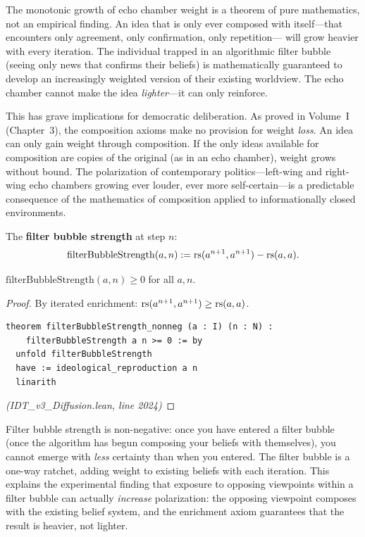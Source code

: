 \begin{interpretation}
The monotonic growth of echo chamber weight is a theorem of pure mathematics,
not an empirical finding. An idea that is only ever composed with
itself---that encounters only agreement, only confirmation, only repetition---
will grow heavier with every iteration. The individual trapped in an
algorithmic filter bubble (seeing only news that confirms their beliefs)
is mathematically guaranteed to develop an increasingly weighted version
of their existing worldview. The echo chamber cannot make the idea
\emph{lighter}---it can only reinforce.

This has grave implications for democratic deliberation. As proved in
Volume~I (Chapter~3), the composition axioms make no provision for
weight \emph{loss}. An idea can only gain weight through composition.
If the only ideas available for composition are copies of the original
(as in an echo chamber), weight grows without bound. The polarization
of contemporary politics---left-wing and right-wing echo chambers growing
ever louder, ever more self-certain---is a predictable consequence of
the mathematics of composition applied to informationally closed environments.
\end{interpretation}

\begin{definition}
\label{def:filter-bubble}
The \textbf{filter bubble strength} at step $n$:
\[
  \mathrm{filterBubbleStrength}(a, n) := \mathrm{rs}(a^{n+1}, a^{n+1}) - \mathrm{rs}(a, a).
\]
\end{definition}

\begin{theorem}
\label{thm:filter-nonneg}
$\mathrm{filterBubbleStrength}(a, n) \geq 0$ for all $a, n$.
\end{theorem}

\begin{proof}
By iterated enrichment: $\mathrm{rs}(a^{n+1}, a^{n+1}) \geq \mathrm{rs}(a, a)$.
\begin{lstlisting}
theorem filterBubbleStrength_nonneg (a : I) (n : N) :
    filterBubbleStrength a n >= 0 := by
  unfold filterBubbleStrength
  have := ideological_reproduction a n
  linarith
\end{lstlisting}
\textit{(IDT\_v3\_Diffusion.lean, line 2024)}
\end{proof}

\begin{interpretation}
Filter bubble strength is non-negative: once you have entered a filter bubble
(once the algorithm has begun composing your beliefs with themselves), you
cannot emerge with \emph{less} certainty than when you entered. The filter
bubble is a one-way ratchet, adding weight to existing beliefs with each
iteration. This explains the experimental finding that exposure to opposing
viewpoints within a filter bubble can actually \emph{increase}
polarization: the opposing viewpoint composes with the existing belief
system, and the enrichment axiom guarantees that the result is heavier,
not lighter.
\end{interpretation}

